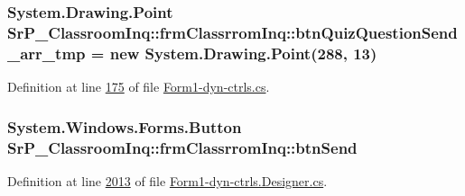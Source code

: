 \hypertarget{class_sr_p___classroom_inq_1_1frm_classrrom_inq_a8dcbe5ae5d44d445994571c17345e756}{
\subsubsection[{btn\-Quiz\-Question\-Send\-\_\-arr\-\_\-tmp}]{\setlength{\rightskip}{0pt plus 5cm}\-System.\-Drawing.\-Point {\bf \-Sr\-P\-\_\-\-Classroom\-Inq\-::frm\-Classrrom\-Inq\-::btn\-Quiz\-Question\-Send\-\_\-arr\-\_\-tmp} = new \-System.\-Drawing.\-Point(288, 13)}}
\label{class_sr_p___classroom_inq_1_1frm_classrrom_inq_a8dcbe5ae5d44d445994571c17345e756}


\-Definition at line \hyperlink{_form1-dyn-ctrls_8cs_source_l00175}{175} of file \hyperlink{_form1-dyn-ctrls_8cs_source}{\-Form1-\/dyn-\/ctrls.\-cs}.

\hypertarget{class_sr_p___classroom_inq_1_1frm_classrrom_inq_a5a1b78305ac1e8f7eb40a5d135fa3525}{
\subsubsection[{btn\-Send}]{\setlength{\rightskip}{0pt plus 5cm}\-System.\-Windows.\-Forms.\-Button {\bf \-Sr\-P\-\_\-\-Classroom\-Inq\-::frm\-Classrrom\-Inq\-::btn\-Send}}}
\label{class_sr_p___classroom_inq_1_1frm_classrrom_inq_a5a1b78305ac1e8f7eb40a5d135fa3525}


\-Definition at line \hyperlink{_form1-dyn-ctrls_8_designer_8cs_source_l02013}{2013} of file \hyperlink{_form1-dyn-ctrls_8_designer_8cs_source}{\-Form1-\/dyn-\/ctrls.\-Designer.\-cs}.

